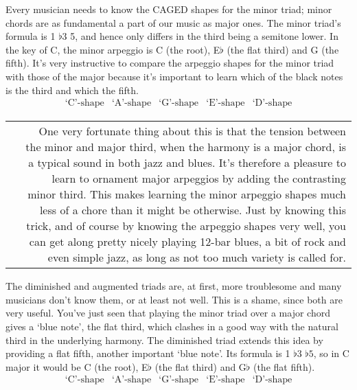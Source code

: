 \documentclass[english]{./gbook}
\begin{document}
\begin{large}
Every musician needs to know the CAGED shapes for the minor triad; minor chords are as fundamental a part of our music as major ones. The minor triad's formula is 1 $\flat 3$ 5, and hence only differs in the third being a semitone lower. In the key of C, the minor arpeggio is C (the root), E$\flat$ (the flat third) and G (the fifth). It's very instructive to compare the arpeggio shapes for the minor triad with those of the major because it's important to learn which of the black notes is the third and which the fifth.
\[
\begin{array}{ccccc}
	\text{`C'-shape} & \text{`A'-shape} & \text{`G'-shape} & \text{`E'-shape} & \text{`D'-shape}
\end{array}
\]
\begin{tabular}{rr}
& 
\parbox[b]{10cm}{
One very fortunate thing about this is that the tension between the minor and major third, when the harmony is a major chord, is a typical sound in both jazz and blues. It's therefore a pleasure to learn to ornament major arpeggios by adding the contrasting minor third. This makes learning the minor arpeggio shapes much less of a chore than it might be otherwise. Just by knowing this trick, and of course by knowing the arpeggio shapes very well, you can get along pretty nicely playing 12-bar blues, a bit of rock and even simple jazz, as long as not too much variety is called for. 
}
\end{tabular}

The diminished and augmented triads are, at first, more troublesome and many musicians don't know them, or at least not well. This is a shame, since both are very useful. You've just seen that playing the minor triad over a major chord gives a `blue note', the flat third, which clashes in a good way with the natural third in the underlying harmony. The diminished triad extends this idea by providing a flat fifth, another important `blue note'. Its formula is 1 $\flat 3$ $\flat 5$, so in C major it would be C (the root), E$\flat$ (the flat third) and G$\flat$ (the flat fifth).
\[
\begin{array}{ccccc}
	\text{`C'-shape} & \text{`A'-shape} & \text{`G'-shape} & \text{`E'-shape} & \text{`D'-shape}
\end{array}
\]


\end{large}
\end{document}
